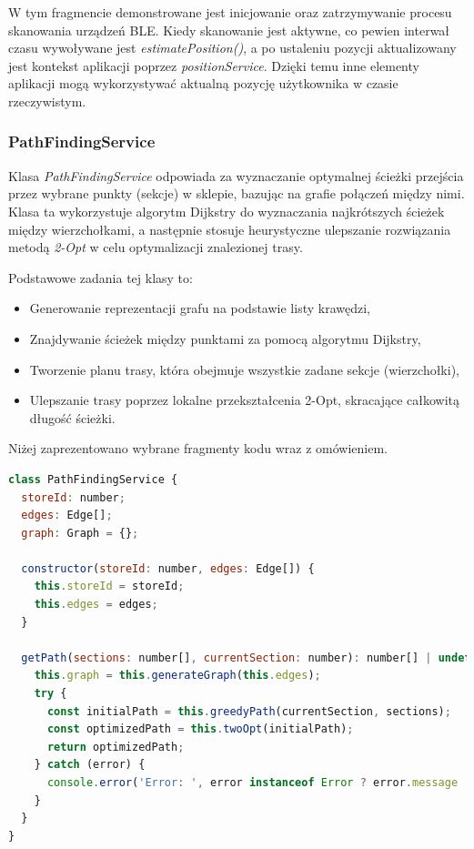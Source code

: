 W tym fragmencie demonstrowane jest inicjowanie oraz zatrzymywanie procesu skanowania urządzeń BLE. Kiedy skanowanie jest aktywne, co pewien interwał czasu wywoływane jest \textit{estimatePosition()}, a po ustaleniu pozycji aktualizowany jest kontekst aplikacji poprzez \textit{positionService}. Dzięki temu inne elementy aplikacji mogą wykorzystywać aktualną pozycję użytkownika w czasie rzeczywistym.

\subsubsection{PathFindingService}

Klasa \textit{PathFindingService} odpowiada za wyznaczanie optymalnej ścieżki przejścia przez wybrane punkty (sekcje) w sklepie, bazując na grafie połączeń między nimi. Klasa ta wykorzystuje algorytm Dijkstry do wyznaczania najkrótszych ścieżek między wierzchołkami, a następnie stosuje heurystyczne ulepszanie rozwiązania metodą \textit{2-Opt} w celu optymalizacji znalezionej trasy.

Podstawowe zadania tej klasy to:  
\begin{itemize}
    \item Generowanie reprezentacji grafu na podstawie listy krawędzi,
    \item Znajdywanie ścieżek między punktami za pomocą algorytmu Dijkstry,
    \item Tworzenie planu trasy, która obejmuje wszystkie zadane sekcje (wierzchołki),
    \item Ulepszanie trasy poprzez lokalne przekształcenia 2-Opt, skracające całkowitą długość ścieżki.
\end{itemize}

Niżej zaprezentowano wybrane fragmenty kodu wraz z omówieniem.

\begin{lstlisting}[language=JavaScript, caption={Inicjalizacja i konstruktor klasy PathFindingService}, label={lst:pathfinding_init}]
class PathFindingService {
  storeId: number;
  edges: Edge[];
  graph: Graph = {};

  constructor(storeId: number, edges: Edge[]) {
    this.storeId = storeId;
    this.edges = edges;
  }

  getPath(sections: number[], currentSection: number): number[] | undefined {
    this.graph = this.generateGraph(this.edges);
    try {
      const initialPath = this.greedyPath(currentSection, sections);
      const optimizedPath = this.twoOpt(initialPath);
      return optimizedPath;
    } catch (error) {
      console.error('Error: ', error instanceof Error ? error.message : error);
    }
  }
}
\end{lstlisting}

